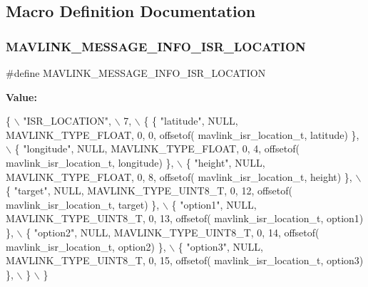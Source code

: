 \subsection{Macro Definition Documentation}
\mbox{\label{mavlink__msg__isr__location_8h_acdeef594c406f9f33a0525dff294e6fa}} 
\subsubsection{M\+A\+V\+L\+I\+N\+K\+\_\+\+M\+E\+S\+S\+A\+G\+E\+\_\+\+I\+N\+F\+O\+\_\+\+I\+S\+R\+\_\+\+L\+O\+C\+A\+T\+I\+ON}
{\footnotesize\ttfamily \#define M\+A\+V\+L\+I\+N\+K\+\_\+\+M\+E\+S\+S\+A\+G\+E\+\_\+\+I\+N\+F\+O\+\_\+\+I\+S\+R\+\_\+\+L\+O\+C\+A\+T\+I\+ON}

{\bfseries Value\+:}
\begin{DoxyCode}
\{ \(\backslash\)
    \textcolor{stringliteral}{"ISR\_LOCATION"}, \(\backslash\)
    7, \(\backslash\)
    \{  \{ \textcolor{stringliteral}{"latitude"}, NULL, MAVLINK_TYPE_FLOAT, 0, 0, offsetof(
      mavlink_isr_location_t, latitude) \}, \(\backslash\)
         \{ \textcolor{stringliteral}{"longitude"}, NULL, MAVLINK_TYPE_FLOAT, 0, 4, offsetof(
      mavlink_isr_location_t, longitude) \}, \(\backslash\)
         \{ \textcolor{stringliteral}{"height"}, NULL, MAVLINK_TYPE_FLOAT, 0, 8, offsetof(
      mavlink_isr_location_t, height) \}, \(\backslash\)
         \{ \textcolor{stringliteral}{"target"}, NULL, MAVLINK_TYPE_UINT8_T, 0, 12, offsetof(
      mavlink_isr_location_t, target) \}, \(\backslash\)
         \{ \textcolor{stringliteral}{"option1"}, NULL, MAVLINK_TYPE_UINT8_T, 0, 13, offsetof(
      mavlink_isr_location_t, option1) \}, \(\backslash\)
         \{ \textcolor{stringliteral}{"option2"}, NULL, MAVLINK_TYPE_UINT8_T, 0, 14, offsetof(
      mavlink_isr_location_t, option2) \}, \(\backslash\)
         \{ \textcolor{stringliteral}{"option3"}, NULL, MAVLINK_TYPE_UINT8_T, 0, 15, offsetof(
      mavlink_isr_location_t, option3) \}, \(\backslash\)
         \} \(\backslash\)
\}
\end{DoxyCode}
\mbox{\label{mavlink__msg__isr__location_8h_ac6b564ab9bfc5f98b04a0f2edc68952a}} 
